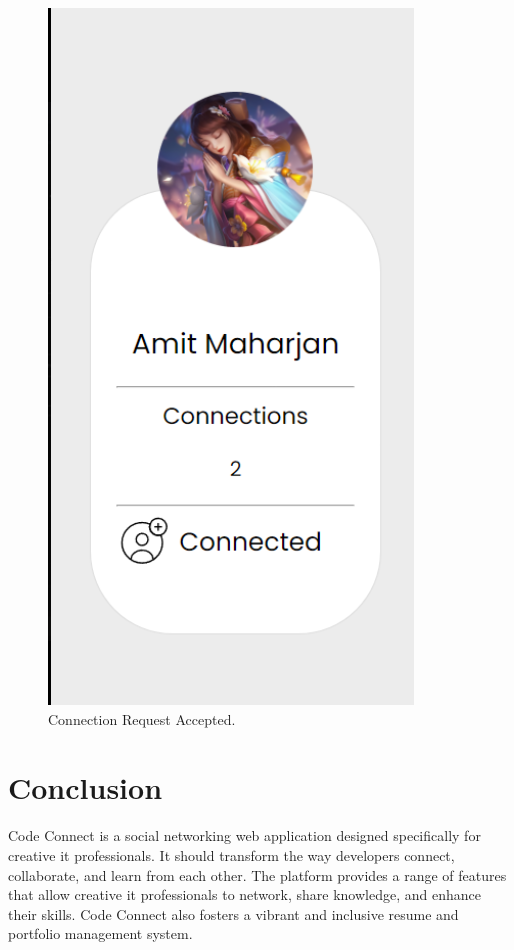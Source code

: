 \begin{figure}[ht]
    \centering
    \includegraphics[height=0.3\textheight]{Outcome-ss/result-after-accepting.png}
    \caption{Connection Request Accepted.}
    \label{fig:Connection Request Accepted}
\end{figure}

\section{Conclusion}
Code Connect is a social networking web application designed specifically for creative it professionals. It should transform the way developers connect, collaborate, and learn from each other. The platform provides a range of features that allow creative it professionals to network, share knowledge, and enhance their skills. Code Connect also fosters a vibrant and inclusive resume and portfolio management system.
